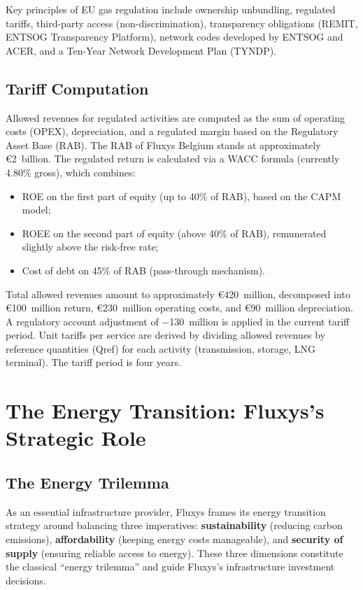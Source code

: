 Key principles of EU gas regulation include ownership unbundling, regulated tariffs, third-party access (non-discrimination), transparency obligations (REMIT, ENTSOG Transparency Platform), network codes developed by ENTSOG and ACER, and a Ten-Year Network Development Plan (TYNDP).

\subsection{Tariff Computation}

Allowed revenues for regulated activities are computed as the sum of operating costs (OPEX), depreciation, and a regulated margin based on the Regulatory Asset Base (RAB). The RAB of Fluxys Belgium stands at approximately €2~billion. The regulated return is calculated via a WACC formula (currently 4.80\% gross), which combines:
\begin{itemize}[noitemsep]
    \item ROE on the first part of equity (up to 40\% of RAB), based on the CAPM model;
    \item ROEE on the second part of equity (above 40\% of RAB), remunerated slightly above the risk-free rate;
    \item Cost of debt on 45\% of RAB (pass-through mechanism).
\end{itemize}

Total allowed revenues amount to approximately €420~million, decomposed into €100~million return, €230~million operating costs, and €90~million depreciation. A regulatory account adjustment of $-$130~million is applied in the current tariff period. Unit tariffs per service are derived by dividing allowed revenues by reference quantities (Qref) for each activity (transmission, storage, LNG terminal). The tariff period is four years.

\section{The Energy Transition: Fluxys's Strategic Role}

\subsection{The Energy Trilemma}

As an essential infrastructure provider, Fluxys frames its energy transition strategy around balancing three imperatives: \textbf{sustainability} (reducing carbon emissions), \textbf{affordability} (keeping energy costs manageable), and \textbf{security of supply} (ensuring reliable access to energy). These three dimensions constitute the classical ``energy trilemma'' and guide Fluxys's infrastructure investment decisions.

